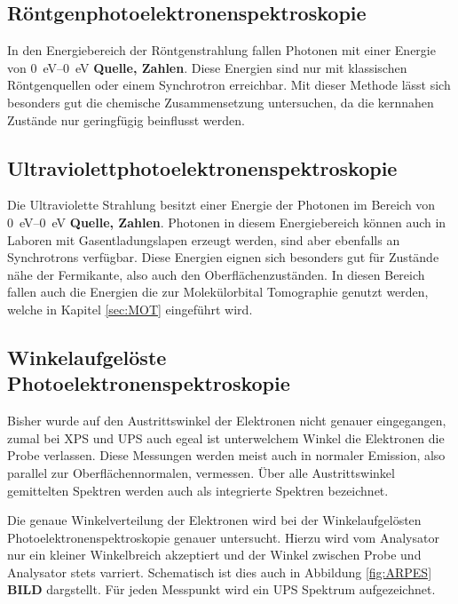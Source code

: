     \subsection{Röntgenphotoelektronenspektroskopie}
    In den Energiebereich der Röntgenstrahlung fallen Photonen mit einer Energie von \SIrange{0}{0}{\electronvolt} \textbf{Quelle, Zahlen}.
    Diese Energien sind nur mit klassischen Röntgenquellen oder einem Synchrotron erreichbar.
    Mit dieser Methode lässt sich besonders gut die chemische Zusammensetzung untersuchen, da die kernnahen Zustände nur geringfügig beinflusst werden.


    \subsection{Ultraviolettphotoelektronenspektroskopie}
    Die Ultraviolette Strahlung besitzt einer Energie der Photonen im Bereich von \SIrange{0}{0}{\electronvolt} \textbf{Quelle, Zahlen}.
    Photonen in diesem Energiebereich können auch in Laboren mit Gasentladungslapen erzeugt werden, sind aber ebenfalls an Synchrotrons verfügbar.
    Diese Energien eignen sich besonders gut für Zustände nähe der Fermikante, also auch den Oberflächenzuständen.
    In diesen Bereich fallen auch die Energien die zur Molekülorbital Tomographie genutzt werden, welche in Kapitel \ref{sec:MOT} eingeführt wird.

    \subsection{Winkelaufgelöste Photoelektronenspektroskopie}
    Bisher wurde  auf den Austrittswinkel der Elektronen nicht genauer eingegangen, zumal bei XPS und UPS auch egeal ist unterwelchem Winkel die Elektronen die Probe verlassen.
    Diese Messungen werden meist auch in normaler Emission, also parallel zur Oberflächennormalen, vermessen.
    Über alle Austrittswinkel gemittelten Spektren werden auch als integrierte Spektren bezeichnet.

    Die genaue Winkelverteilung der Elektronen wird bei der Winkelaufgelösten Photoelektronenspektroskopie genauer untersucht.
    Hierzu wird vom Analysator nur ein kleiner Winkelbreich akzeptiert und der Winkel zwischen Probe und Analysator stets varriert.
    Schematisch ist dies auch in Abbildung \ref{fig:ARPES} \textbf{BILD} dargstellt.
    Für jeden Messpunkt wird ein UPS Spektrum aufgezeichnet.

